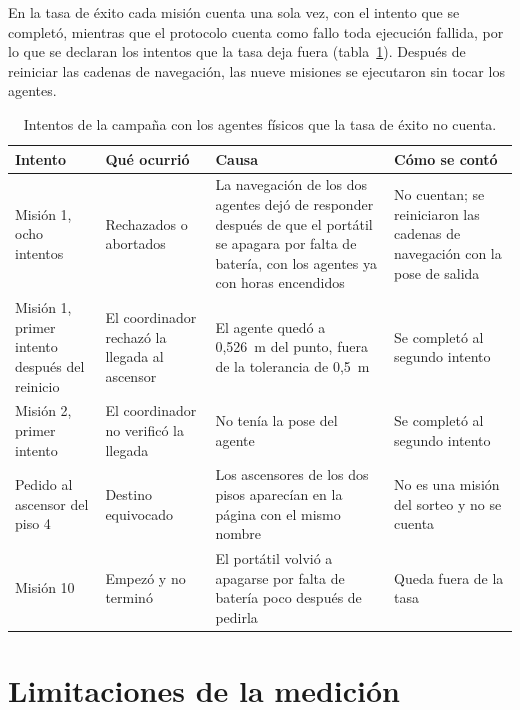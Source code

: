 En la tasa de éxito cada misión cuenta una sola vez, con el intento que se completó, mientras que el protocolo cuenta como fallo toda ejecución fallida, por lo que se declaran los intentos que la tasa deja fuera (tabla~\ref{tab:incidencias}). Después de reiniciar las cadenas de navegación, las nueve misiones se ejecutaron sin tocar los agentes.

\begin{table}[H]
  \centering\footnotesize{}
  \caption{Intentos de la campaña con los agentes físicos que la tasa de éxito no cuenta.}
  \label{tab:incidencias}
  \begin{tabular}{@{}>{\raggedright\arraybackslash}p{}>{\raggedright\arraybackslash}p{}>{\raggedright\arraybackslash}p{}>{\raggedright\arraybackslash}p{}@{}}
    \toprule
    \textbf{Intento} & \textbf{Qué ocurrió} & \textbf{Causa} & \textbf{Cómo se contó} \\ \midrule
    Misión 1, ocho intentos & Rechazados o abortados & La navegación de los dos agentes dejó de responder después de que el portátil se apagara por falta de batería, con los agentes ya con horas encendidos & No cuentan; se reiniciaron las cadenas de navegación con la pose de salida \\ \addlinespace
    Misión 1, primer intento después del reinicio & El coordinador rechazó la llegada al ascensor & El agente quedó a 0,526~m del punto, fuera de la tolerancia de 0,5~m & Se completó al segundo intento \\ \addlinespace
    Misión 2, primer intento & El coordinador no verificó la llegada & No tenía la pose del agente & Se completó al segundo intento \\ \addlinespace
    Pedido al ascensor del piso 4 & Destino equivocado & Los ascensores de los dos pisos aparecían en la página con el mismo nombre & No es una misión del sorteo y no se cuenta \\ \addlinespace
    Misión 10 & Empezó y no terminó & El portátil volvió a apagarse por falta de batería poco después de pedirla & Queda fuera de la tasa \\ \bottomrule
  \end{tabular}
\end{table}

\section{Limitaciones de la medición}
\label{sec:limitaciones}


